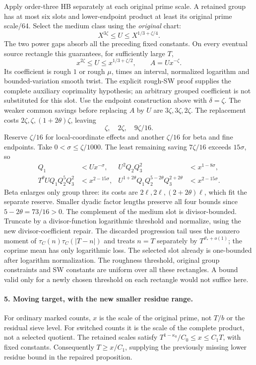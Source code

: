 Apply order-three HB separately at each original prime scale.
A retained group has at most six slots and lower-endpoint product
at least its original prime scale/64. Select the medium class using
the \emph{original} chart:
\[
 X^{3\zeta}\le U\le X^{1/3+\zeta/4}.
\]
The two power gaps absorb all the preceding fixed constants. On every
eventual source rectangle this guarantees, for sufficiently large $T$,
\[
 x^{2\zeta}\le U\le x^{1/3+\zeta/2},\qquad A=Ux^{-\zeta}.
\]
Its coefficient is rough $1$ or rough $\mu$, times an interval,
normalized logarithm and bounded-variation smooth twist. The explicit
rough-SW proof supplies the complete auxiliary coprimality hypothesis;
an arbitrary grouped coefficient is not substituted for this slot.
Use the endpoint construction above with $\delta=\zeta$.
The weaker common savings before replacing $A$ by $U$ are
$3\zeta,3\zeta,2\zeta$. The replacement costs
$2\zeta,\zeta,(1+2\theta)\zeta$, leaving
\[
 \zeta,\quad2\zeta,\quad9\zeta/16.                       \tag{H4}
\]
Reserve $\zeta/16$ for local-coordinate effects and another
$\zeta/16$ for beta and fine endpoints. Take $0<\sigma\le\zeta/1000$.
The least remaining saving $7\zeta/16$ exceeds $15\sigma$, so
\begin{align*}
 Q_1&<Ux^{-\sigma},& U^2Q_2Q_3^2&<x^{1-8\sigma},\\
 T^\theta UQ_1Q_2^5Q_3^2&<x^{2-15\sigma},&
 U^{1+2\theta}Q_1Q_2^{5-2\theta}Q_3^{2+2\theta}
   &<x^{2-15\sigma}.                                   \tag{H5}
\end{align*}
Beta enlarges only group three: its costs are $2\ell,2\ell,
(2+2\theta)\ell$, which fit the separate reserve. Smaller dyadic
factor lengths preserve all four bounds since $5-2\theta=73/16>0$.
The complement of the medium slot is divisor-bounded. Truncate by
a divisor-function logarithmic threshold and normalize, using the new
divisor-coefficient repair. The discarded progression tail uses the
nonzero moment of $\tau_C(n)\tau_C(|T-n|)$ and treats $n=T$ separately
by $T^{\vartheta_*+o(1)}$; the coprime mean has only logarithmic loss.
The selected slot already is one-bounded after logarithm normalization.
The roughness threshold, original group constraints and SW constants
are uniform over all these rectangles. A bound valid only for a
newly chosen threshold on each rectangle would not suffice here.

\paragraph{5. Moving target, with the new smaller residue range.}
For ordinary marked counts, $x$ is the scale of the original prime,
not $T/b$ or the residual sieve level. For switched counts it is the
scale of the complete product, not a selected quotient. The retained
scales satisfy $T^{1-\kappa_0}/C_0\le x\le C_1T$, with fixed constants.
Consequently $T\ge x/C_1$, supplying the previously missing lower
residue bound in the repaired proposition.

